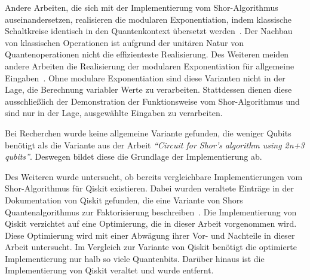 Andere Arbeiten, die sich mit der Implementierung vom Shor-Algorithmus auseinandersetzen,
realisieren die modularen Exponentiation, 
indem klassische Schaltkreise identisch in den Quantenkontext übersetzt werden~\cite{Vedral_1996}.
Der Nachbau von klassischen Operationen ist aufgrund der unitären Natur von Quantenoperationen nicht die effizienteste Realisierung.
Des Weiteren meiden andere Arbeiten die Realisierung der modularen Exponentiation für allgemeine Eingaben~\cite{9376169,9686492}. 
Ohne modulare Exponentiation sind diese Varianten nicht in der Lage, 
die Berechnung variabler Werte zu verarbeiten.
Stattdessen dienen diese ausschließlich der Demonstration der Funktionsweise vom Shor-Algorithmus und
sind nur in der Lage, ausgewählte Eingaben zu verarbeiten.

Bei Recherchen wurde keine allgemeine Variante gefunden,
die weniger Qubits benötigt als die Variante aus der Arbeit \textit{"`Circuit for Shor’s algorithm using 2n+3 qubits"'}.
Deswegen bildet diese die Grundlage der Implementierung ab.

Des Weiteren wurde untersucht, 
ob bereits vergleichbare Implementierungen vom Shor-Algorithmus für Qiskit existieren. 
Dabei wurden veraltete Einträge in der Dokumentation von Qiskit gefunden, 
die eine Variante von Shors Quantenalgorithmus zur Faktorisierung beschreiben~\cite{QiskitShorImplementations}. 
Die Implementierung von Qiskit verzichtet auf eine Optimierung, die in dieser Arbeit vorgenommen wird. 
Diese Optimierung wird mit einer Abwägung ihrer Vor- und Nachteile in dieser Arbeit untersucht. 
Im Vergleich zur Variante von Qiskit benötigt die optimierte Implementierung nur halb so viele Quantenbits. 
Darüber hinaus ist die Implementierung von Qiskit veraltet und wurde entfernt.